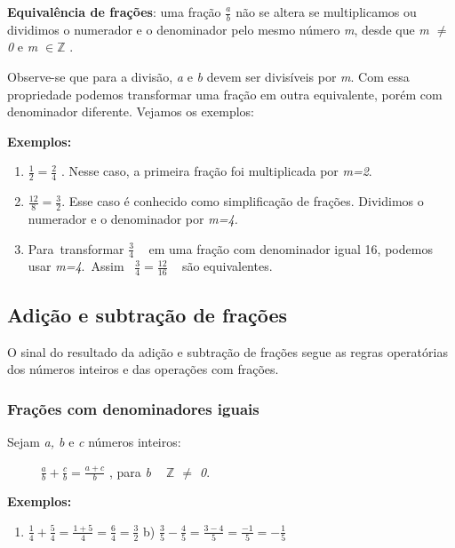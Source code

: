 \textbf{Equivalência de frações}: uma fração  \( \frac{a}{b} \)   não se altera se multiplicamos ou dividimos o numerador e o denominador pelo mesmo número \textit{m}, desde que\textit{ m $ \neq $  0 }e\textit{ m  \(\in \mathbb{Z} \) }.

 \quad {}

Observe-se que para a divisão, \textit{a} e \textit{b} devem ser divisíveis por \textit{m}. Com essa propriedade podemos transformar uma fração em outra equivalente, porém com denominador diferente. Vejamos os exemplos:

\textbf{Exemplos:}

\begin{enumerate}
	\item  \( \frac{1}{2}=\frac{2}{4} \)  . Nesse caso, a primeira fração foi multiplicada por \textit{m=2}.

	\item   \( \frac{12}{8}=\frac{3}{2} \). Esse caso é conhecido como simplificação de frações. Dividimos o numerador e o denominador por \textit{m=4.}

	\item Para~transformar   \( \frac{3}{4} \) ~ em uma fração com denominador igual 16, podemos usar \textit{m=4}.~Assim~   \( \frac{3}{4}=\frac{12}{16} \) ~ são equivalentes.
\end{enumerate}

\subsection{Adição e subtração de frações }

\quad O sinal do resultado da adição e subtração de frações segue as regras operatórias dos números inteiros e das operações com frações.

\quad 
\subsubsection{Frações com denominadores iguais}

Sejam \textit{a, b} e \textit{c} números inteiros: 

\textbf{\quad ~~~~  \( \frac{a}{b}+\frac{c}{b}=\frac{a+c}{b} \) \quad }{ \quad , para \textit{b ~  \( \mathbb{Z} \)  $ \neq $  0}.}

\textbf{Exemplos: }

\begin{enumerate}
	\item  \( \frac{1}{4}+\frac{5}{4}=\frac{1+5}{4}=\frac{6}{4}=\frac{3}{2} \) \quad \quad b)  \( \frac{3}{5}-\frac{4}{5}=\frac{3-4}{5}=\frac{-1}{5}=-\frac{1}{5} \) \quad 
\end{enumerate}

